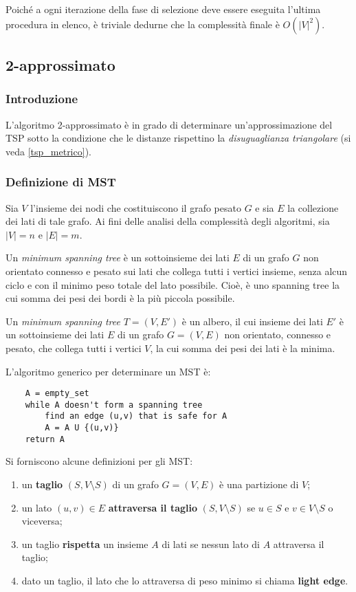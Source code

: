 Poiché a ogni iterazione della fase di selezione deve essere eseguita l'ultima procedura in elenco, è triviale dedurne che la complessità finale è $O(|V|^2)$.

\subsection{2-approssimato}

\subsubsection{Introduzione}

L'algoritmo 2-approssimato è in grado di determinare un'approssimazione del TSP sotto la condizione che le
distanze rispettino la \textit{disuguaglianza triangolare} (si veda \ref{tsp_metrico}).

\subsubsection{Definizione di MST}

Sia $V$ l'insieme dei nodi che costituiscono il grafo pesato $G$ e sia $E$ la collezione dei lati di tale
grafo. Ai fini delle analisi della complessità degli algoritmi, sia $|V| = n$ e $|E| = m$.

Un \textit{minimum spanning tree} è un
sottoinsieme dei lati $E$ di un grafo $G$ non orientato connesso e pesato sui lati che
collega tutti i vertici insieme, senza alcun ciclo e con il minimo peso totale del
lato possibile. Cioè, è uno spanning tree la cui somma dei pesi dei bordi è la più
piccola possibile.

Un \textit{minimum spanning tree} $T = (V, E')$ è un albero, il cui insieme dei lati $E'$ è un
sottoinsieme dei lati $E$ di un grafo $G = (V, E)$ non orientato, connesso e
pesato, che collega tutti i vertici $V$, la cui somma dei pesi dei lati è la minima.

L'algoritmo generico per determinare un MST è:
\begin{verbatim}
    A = empty_set
    while A doesn't form a spanning tree
        find an edge (u,v) that is safe for A
        A = A U {(u,v)}
    return A
\end{verbatim}

Si forniscono alcune definizioni per gli MST:
\begin{enumerate}
    \item un \textbf{taglio} $(S, V \setminus S)$ di un grafo $G = (V, E)$ è una partizione
    di $V$;
    \item un lato $(u, v) \in E$ \textbf{attraversa il taglio} $(S, V \setminus S)$ se
    $u \in S$ e $v \in V \setminus S$ o viceversa;
    \item un taglio \textbf{rispetta} un insieme $A$ di lati se nessun lato di $A$ attraversa
    il taglio;
    \item dato un taglio, il lato che lo attraversa di peso minimo si chiama \textbf{light edge}.
\end{enumerate}

